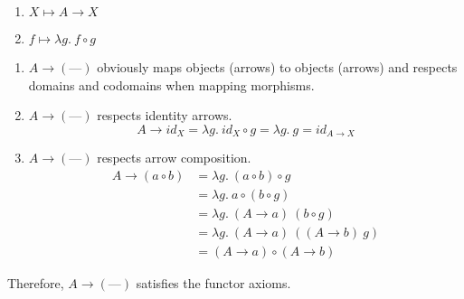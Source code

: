 \begin{itemize}
		\begin{enumerate}
			\item $X ↦ A → X$
			\item $f ↦ λg.\ f ∘ g$
		\end{enumerate}

		\begin{enumerate}
			\item $A → (—)$ obviously maps objects (arrows) to objects (arrows) and respects domains and codomains when mapping morphisms.
			\item $A → (—)$ respects identity arrows.
				$$A → id_X = λg.\ id_X ∘ g = λg.\ g = id_{A → X}$$
			\item $A → (—)$ respects arrow composition.
				\begin{align}
					A → (a ∘ b) & = λg.\ (a ∘ b) ∘ g \\
					& = λg.\ a ∘ (b ∘ g) \\
					& = λg.\ (A → a)\ (b ∘ g) \\
					& = λg.\ (A → a)\ ((A → b)\ g) \\
					& = (A → a) ∘ (A → b)
				\end{align}
		\end{enumerate}

		Therefore, $A → (—)$ satisfies the functor axioms.
\end{itemize}
